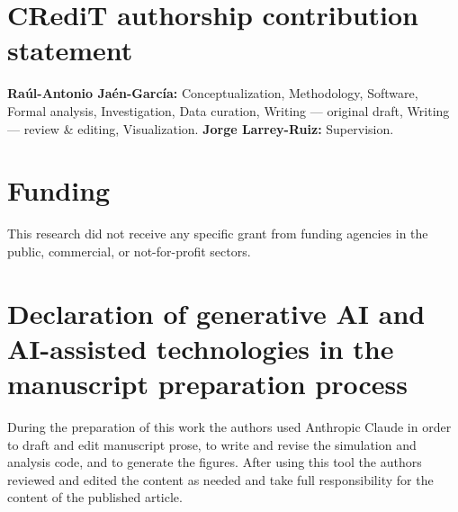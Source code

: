 \documentclass[review,3p,times]{elsarticle}
\begin{document}
\section*{CRediT authorship contribution statement}

\textbf{Ra\'ul-Antonio Ja\'en-Garc\'ia:} Conceptualization, Methodology,
Software, Formal analysis, Investigation, Data curation, Writing --- original
draft, Writing --- review \& editing, Visualization.
\textbf{Jorge Larrey-Ruiz:} Supervision.

\section*{Funding}

This research did not receive any specific grant from funding agencies in the
public, commercial, or not-for-profit sectors.

\section*{Declaration of generative AI and AI-assisted technologies in the
manuscript preparation process}

%
During the preparation of this work the authors used Anthropic Claude in order
to draft and edit manuscript prose, to write and revise the simulation and
analysis code, and to generate the figures. After using this tool the authors
reviewed and edited the content as needed and take full responsibility for
the content of the published article.



\end{document}
